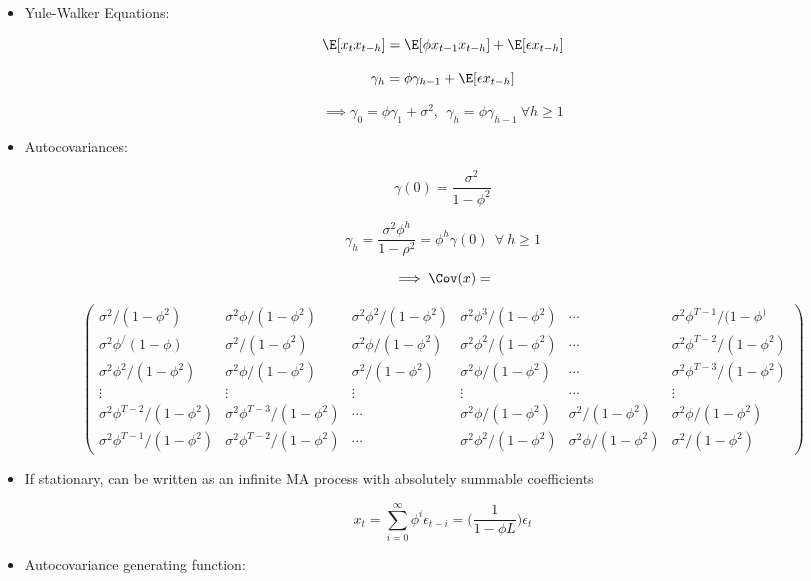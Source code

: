 \begin{itemize}

\item Yule-Walker Equations: 

\[
\E[x_t x_{t-h} ]= \E[ \phi x_{t-1}x_{t-h}] + \E[ \epsilon x_{t-h}]
\]

\[
\gamma_h = \phi \gamma_{h-1} + \E[ \epsilon x_{t-h}]
\]

\[
\implies \gamma_0 = \phi \gamma_1+\sigma^2,  \  \ \gamma_h = \phi \gamma_{h-1} \ \forall h \geq 1 
\]

\item Autocovariances:

\[
\gamma(0) = \frac{\sigma^2}{1 - \phi^2}
\]


\[
\gamma_h = \frac{\sigma^2 \phi^h}{1 - \rho^2} = \phi^h \gamma(0) \ \ \forall \ h \geq 1
\]

\[
\implies \Cov(x) = 
\]

\[
\begin{pmatrix} 
\sigma^2/(1 - \phi^2) &  \sigma^2\phi/(1 - \phi^2) & \sigma^2\phi^2/(1 - \phi^2)  &  \sigma^2\phi^3/(1 - \phi^2) & \cdots &  \sigma^2\phi^{T - 1} /(1 - \phi^) \\
\sigma^2\phi^/(1 - \phi)& \sigma^2/(1 - \phi^2) & \sigma^2\phi/(1 - \phi^2) & \sigma^2\phi^2/(1 - \phi^2) & \cdots & \sigma^2\phi^{T - 2}/(1 - \phi^2) \\
\sigma^2\phi^2/(1 - \phi^2) & \sigma^2\phi/(1 - \phi^2) & \sigma^2/(1 - \phi^2) & \sigma^2\phi/(1 - \phi^2) & \cdots & \sigma^2\phi^{T - 3}/(1 - \phi^2)  \\
\vdots & \vdots & \vdots & \vdots & \cdots & \vdots \\
\sigma^2\phi^{T-2}/(1 - \phi^2) & \sigma^2\phi^{T-3}/(1 - \phi^2) & \cdots &\sigma^2\phi/(1 - \phi^2)  & \sigma^2/(1 - \phi^2) &\sigma^2\phi/(1 - \phi^2) \\
\sigma^2\phi^{T-1} /(1 - \phi^2) & \sigma^2\phi^{T-2}/(1 - \phi^2) &  \cdots & \sigma^2\phi^2/(1 - \phi^2)  & \sigma^2\phi/(1 - \phi^2)  & \sigma^2/(1 - \phi^2)
\end{pmatrix} 
\]

\item If stationary, can be written as an infinite MA process with absolutely summable coefficients

\[
x_t = \sum_{i=0}^ \infty \phi^i \epsilon_{t-i} = \bigg( \frac{1}{1 - \phi L} \bigg) \epsilon_t
\]

\item Autocovariance generating function:


\end{itemize}

